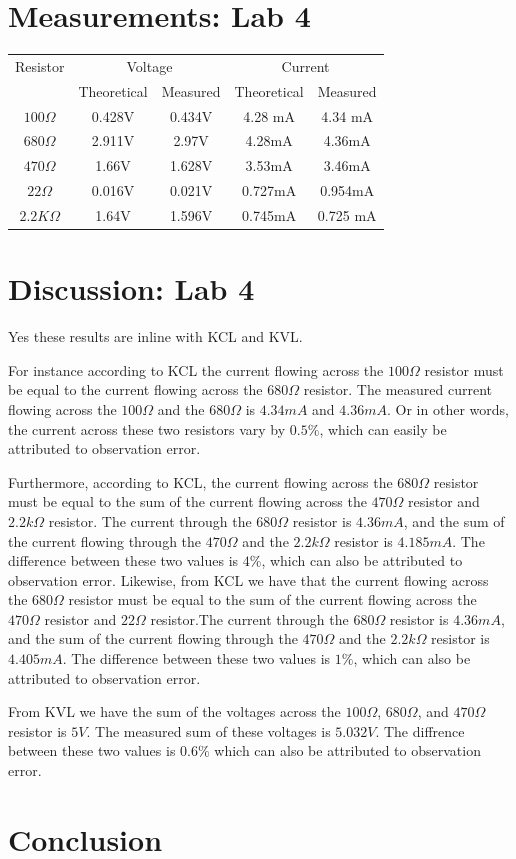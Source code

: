 \documentclass[12pt]{article}
\begin{document}
\section*{Measurements: Lab 4}
\begin{tabular}{||c|c|c|c|c||}
\hline
Resistor & \multicolumn{2}{|c|}{Voltage} &\multicolumn{2}{|c|}{Current}\\
& Theoretical & Measured & Theoretical& Measured\\
\hline
$100\Omega$ & 0.428V & 0.434V & 4.28 mA & 4.34 mA\\
\hline
$680\Omega$ &2.911V& 2.97V&4.28mA &4.36mA\\
\hline
$470\Omega$ &1.66V&1.628V&3.53mA&3.46mA\\
\hline
$22\Omega$&0.016V&0.021V&0.727mA&0.954mA\\
\hline
$2.2K\Omega$&1.64V&1.596V&0.745mA&0.725
mA\\
\hline
\end{tabular}
\pagebreak
\section*{Discussion: Lab 4}
Yes these results are inline with KCL and KVL. 

For instance according to KCL the current flowing across the $100\Omega$ resistor must be equal to the current flowing across the $680\Omega$ resistor. The measured current flowing across the $100\Omega$ and the $680\Omega$ is 
$4.34mA$ and $4.36mA$. Or in other words, the current across these two resistors vary by $0.5\%$, which can easily be attributed to observation error.

Furthermore, according to KCL, the current flowing across the $680\Omega$ resistor must be equal to the sum of the current flowing across the $470\Omega$ resistor and $2.2k\Omega$ resistor. The current through the $680\Omega$ resistor is $4.36mA$, and the sum of the current flowing through the $470\Omega$ and the $2.2k\Omega$ resistor is $4.185mA$. The difference between these two values is $4\%$, which can also be attributed to observation error. Likewise, from KCL we have that the current flowing across the $680\Omega$ resistor must be equal to the sum of the current flowing across the $470\Omega$ resistor and $22\Omega$ resistor.The current through the $680\Omega$ resistor is $4.36mA$, and the sum of the current flowing through the $470\Omega$ and the $2.2k\Omega$ resistor is $4.405mA$. The difference between these two values is $1\%$, which can also be attributed to observation error.

From KVL we have the sum of the voltages across the  $100\Omega$, $680\Omega$, and $470\Omega$ resistor is $5V$. The measured sum of these voltages is $5.032V$. The diffrence between these two values is $0.6\%$ which can also be attributed to observation error.
\pagebreak
\section*{Conclusion}
\end{document}
